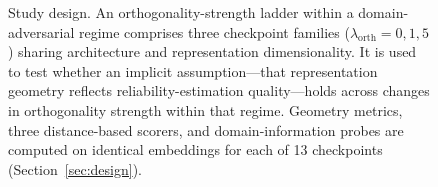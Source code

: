 \begin{figure}[t]
\centering
{}
\caption{Study design. An orthogonality-strength ladder within a domain-adversarial regime comprises three checkpoint families ($\lambda_{\mathrm{orth}} = 0, 1, 5$) sharing architecture and representation dimensionality. It is used to test whether an implicit assumption---that representation geometry reflects reliability-estimation quality---holds across changes in orthogonality strength within that regime. Geometry metrics, three distance-based scorers, and domain-information probes are computed on identical embeddings for each of 13 checkpoints (Section~\ref{sec:design}).}
\label{fig:study-design}
\end{figure}
